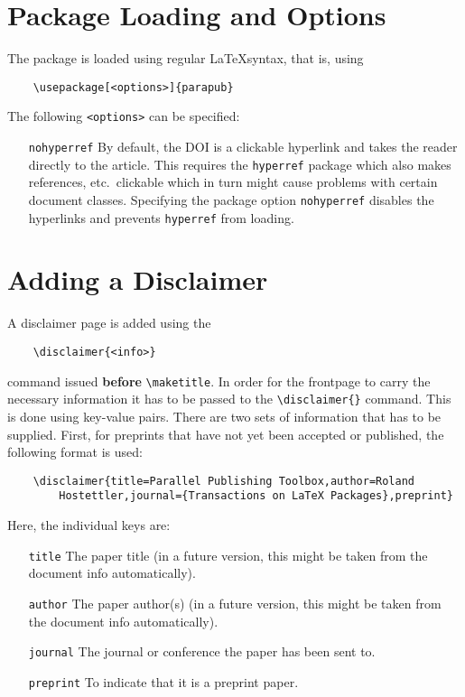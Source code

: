 \section{Package Loading and Options}
The package is loaded using regular \LaTeX syntax, that is, using
%
\begin{verbatim}
	\usepackage[<options>]{parapub}
\end{verbatim}

The following \texttt{<options>} can be specified:
%
\begin{itemize}
	\item[\texttt{nohyperref}] By default, the DOI is a clickable hyperlink and takes the reader directly to the article. This requires the \texttt{hyperref} package which also makes references, etc.\ clickable which in turn might cause problems with certain document classes. Specifying the package option \texttt{nohyperref} disables the hyperlinks and prevents \texttt{hyperref} from loading.
\end{itemize}


\section{Adding a Disclaimer}
A disclaimer page is added using the
%
\begin{verbatim}
	\disclaimer{<info>}
\end{verbatim}
%
command issued \textbf{before} \verb|\maketitle|. In order for the frontpage to carry the necessary information it has to be passed to the \verb|\disclaimer{}| command. This is done using key-value pairs. There are two sets of information that has to be supplied. First, for preprints that have not yet been accepted or published, the following format is used:
%
\begin{verbatim}
	\disclaimer{title=Parallel Publishing Toolbox,author=Roland
	    Hostettler,journal={Transactions on LaTeX Packages},preprint}
\end{verbatim}

Here, the individual keys are:
%
\begin{itemize}
	\item[\texttt{title}]     The paper title (in a future version, this might be taken from the document info automatically).
	
	\item[\texttt{author}]    The paper author(s) (in a future version, this might be taken from the document info automatically).
	
	\item[\texttt{journal}]   The journal or conference the paper has been sent to.
	
	\item[\texttt{preprint}]  To indicate that it is a preprint paper.
\end{itemize}

